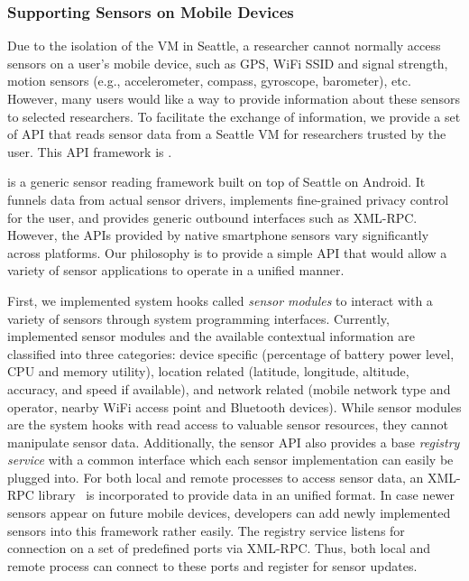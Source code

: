 \subsubsection{Supporting Sensors on Mobile Devices}

Due to the isolation of the VM in Seattle, a researcher cannot normally access
sensors on a user's mobile device, such as GPS, WiFi SSID and signal strength,
motion sensors (e.g., accelerometer, compass, gyroscope, barometer), etc.
However, many users would like a way to provide information about these sensors
to selected researchers. To facilitate the exchange of information, we provide a
set of API that reads sensor data from a Seattle VM for researchers trusted by
the user. This API framework is \sensorname. 

\sensorname is a generic sensor reading framework built on top of Seattle on
Android. It funnels data from actual sensor drivers, implements fine-grained
privacy control for the user, and provides generic outbound interfaces such as
XML-RPC. However, the APIs provided by native smartphone sensors vary
significantly across platforms. Our philosophy is to provide a simple API that  
would allow a variety of sensor applications to operate in a unified manner.

First, we implemented system hooks called {\it sensor modules} to interact with
a variety of sensors through system programming interfaces. Currently,
implemented sensor modules and the available contextual information are
classified into three categories: device specific (percentage of battery power
level, CPU and memory utility), location related (latitude, longitude, altitude,
accuracy, and speed if available), and network related (mobile network type and
operator, nearby WiFi access point and Bluetooth devices). While sensor modules
are the system hooks with read access to valuable sensor resources, they cannot
manipulate sensor data. Additionally, the sensor API also provides a base {\it
registry service} with a common interface which each sensor implementation can
easily be plugged into.  For both local and remote processes to access sensor
data, an XML-RPC library~\cite{xmlrpc-android} is incorporated to provide data
in an unified format. In case newer sensors appear on future mobile devices,
developers can add newly implemented sensors into this framework rather easily.
The registry service listens for connection on a set of predefined ports via
XML-RPC. Thus, both local and remote process can connect to these ports and
register for sensor updates. 

